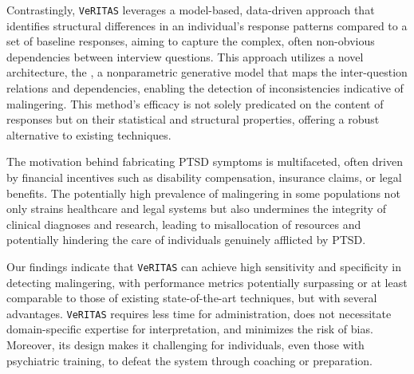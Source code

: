 \documentclass[onecolumn,10pt]{IEEEtran}
\def\vrts{\texttt{VeRITAS}\xspace}
\begin{document}
Contrastingly, \vrts leverages a model-based, data-driven approach that identifies structural differences in an individual's response patterns compared to a set of baseline responses, aiming to capture the complex, often non-obvious dependencies between interview questions. This approach utilizes a novel architecture, the \qnet, a nonparametric generative model that maps the inter-question relations and dependencies, enabling the detection of inconsistencies indicative of malingering. This method's efficacy is not solely predicated on the content of responses but on their statistical and structural properties, offering a robust alternative to existing techniques.

The motivation behind fabricating PTSD symptoms is multifaceted, often driven by financial incentives such as disability compensation, insurance claims, or legal benefits. %
The potentially high prevalence of malingering in some populations  not only strains healthcare and legal systems but also undermines the integrity of clinical diagnoses and research, leading to misallocation of resources and potentially hindering the care of individuals genuinely afflicted by PTSD.

Our findings indicate that \vrts can achieve high sensitivity and specificity in detecting malingering, with performance metrics potentially surpassing or at least comparable to those of existing state-of-the-art techniques, but with several advantages. \vrts requires less time for administration, does not necessitate domain-specific expertise for interpretation, and minimizes the risk of bias. Moreover, its design makes it challenging for individuals, even those with psychiatric training, to defeat the system through coaching or preparation.
\end{document}
